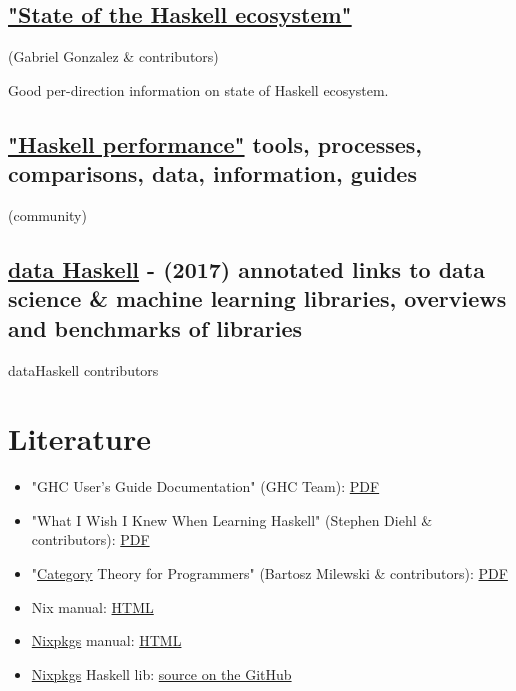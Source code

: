 \documentclass[a4paper,14pt,oneside]{book}
\begin{document}
\section{\href{https://github.com/Gabriel439/post-rfc/blob/master/sotu.md}{"State of the Haskell ecosystem"}}
\label{sec:org19f0cf0}
(Gabriel Gonzalez \& contributors)

Good per-direction information on state of Haskell ecosystem.

\section{\href{https://github.com/haskell-perf}{"Haskell performance"} tools, processes, comparisons, data, information, guides}
\label{sec:org0909766}
(community)

\section{\href{http://www.datahaskell.org/docs}{data Haskell} - (2017) annotated links to data science \& machine learning libraries, overviews and benchmarks of libraries}
\label{sec:orgd74a7c6}
dataHaskell contributors

\chapter{Literature}
\label{sec:orgc0e9c05}

\begin{itemize}
\item "GHC User’s Guide Documentation" (GHC Team): \href{https://downloads.haskell.org/\~ghc/latest/docs/users\_guide.pdf}{PDF}
\item "What I Wish I Knew When Learning Haskell" (Stephen Diehl \& contributors): \href{http://dev.stephendiehl.com/hask/tutorial.pdf}{PDF}
\item "\hyperref[orge8582a1]{Category} Theory for Programmers" (Bartosz Milewski \& contributors): \href{https://s3.amazonaws.com/milewski-ctfp-pdf/category-theory-for-programmers.pdf}{PDF}
\item Nix manual: \href{https://nixos.org/nix/manual/}{HTML}
\item \hyperref[org507892b]{Nixpkgs} manual: \href{https://nixos.org/nixpkgs/manual/}{HTML}
\item \hyperref[org507892b]{Nixpkgs} Haskell lib: \href{https://github.com/NixOS/nixpkgs/blob/master/pkgs/development/haskell-modules/lib.nix}{source on the GitHub}
\end{itemize}
\end{document}
